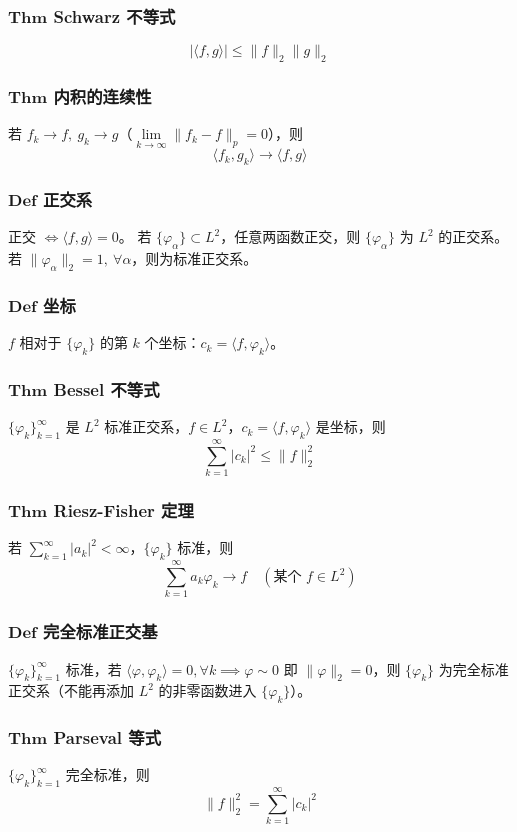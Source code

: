 \documentclass{article}
\begin{document}
	\subsubsection{$\bm{Thm}$ Schwarz 不等式}
	\[
	|\langle f,g\rangle| \le \|f\|_2\|g\|_2
	\]
	
	\subsubsection{$\bm{Thm}$ 内积的连续性}
	若 $f_k\to f,\ g_k\to g$（$\lim\limits_{k\to\infty}\|f_k-f\|_p=0$），则
	\[
	\langle f_k,g_k\rangle \to \langle f,g\rangle
	\]
	
	\subsubsection{$\bm{Def}$ 正交系}
	正交 $\iff \langle f,g\rangle = 0$。
	若 $\{\varphi_\alpha\}\subset L^2$，任意两函数正交，则 $\{\varphi_\alpha\}$ 为 $L^2$ 的正交系。
	若 $\|\varphi_\alpha\|_2=1,\ \forall\alpha$，则为标准正交系。
	
	\subsubsection{$\bm{Def}$ 坐标}
	$f$ 相对于 $\{\varphi_k\}$ 的第 $k$ 个坐标：$c_k = \langle f,\varphi_k\rangle$。
	
	\subsubsection{$\bm{Thm}$ Bessel 不等式}
	$\{\varphi_k\}_{k=1}^\infty$ 是 $L^2$ 标准正交系，$f\in L^2$，$c_k=\langle f,\varphi_k\rangle$ 是坐标，则
	\[
	\sum_{k=1}^\infty |c_k|^2 \le \|f\|_2^2
	\]
	
	\subsubsection{$\bm{Thm}$ Riesz-Fisher 定理}
	若 $\sum\limits_{k=1}^\infty |a_k|^2<\infty$，$\{\varphi_k\}$ 标准，则
	\[
	\sum_{k=1}^\infty a_k\varphi_k \to f \quad (\text{某个 } f\in L^2)
	\]
	
	\subsubsection{$\bm{Def}$ 完全标准正交基}
	$\{\varphi_k\}_{k=1}^\infty$ 标准，若 $\langle \varphi,\varphi_k\rangle=0,\forall k \implies \varphi\sim 0$ 即 $\|\varphi\|_2=0$，则 $\{\varphi_k\}$ 为完全标准正交系（不能再添加 $L^2$ 的非零函数进入 $\{\varphi_k\}$）。
	
	\subsubsection{$\bm{Thm}$ Parseval 等式}
	$\{\varphi_k\}_{k=1}^\infty$ 完全标准，则
	\[
	\|f\|_2^2 = \sum_{k=1}^\infty |c_k|^2
	\]
	
\end{document}
